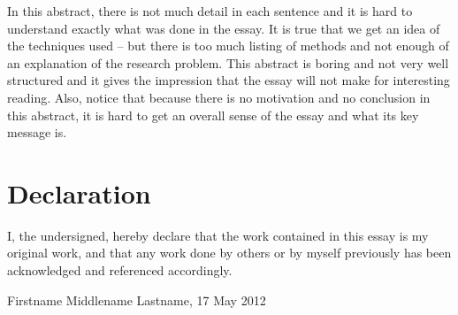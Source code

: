 In this abstract, there is not much detail in each sentence and it is hard to understand exactly what was done in the essay. It is true that we get an idea of the techniques used -- but there is too much listing of methods and not enough of an explanation of the research problem. This abstract is boring and not very well structured and it gives the impression that the essay will not make for interesting reading. Also, notice that because there is no motivation and no conclusion in this abstract, it is hard to get an overall sense of the essay and what its key message is.



\vfill
\section*{Declaration}
I, the undersigned, hereby declare that the work contained in this essay is my original work, and that any work done by others or by myself previously has been acknowledged and referenced accordingly.

Firstname Middlename Lastname, 17 May 2012
